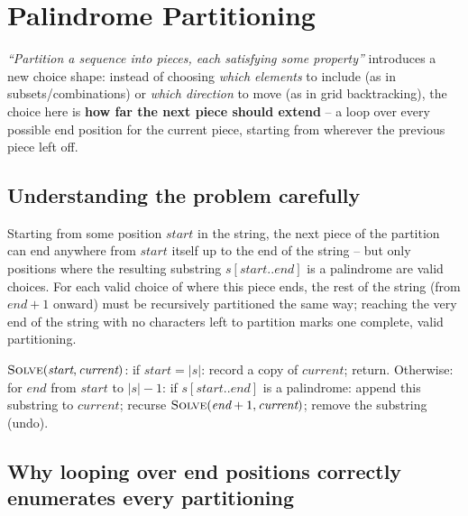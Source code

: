 \section{Palindrome Partitioning}
\label{sec:rec-palindrome-partitioning}


\begin{patternbox}
\emph{``Partition a sequence into pieces, each satisfying some
property''} introduces a new choice shape: instead of choosing
\emph{which elements} to include (as in subsets/combinations) or
\emph{which direction} to move (as in grid backtracking), the choice here
is \textbf{how far the next piece should extend} -- a loop over every
possible end position for the current piece, starting from wherever the
previous piece left off.
\end{patternbox}

\subsection*{Understanding the problem carefully}

Starting from some position $\textit{start}$ in the string, the next
piece of the partition can end anywhere from $\textit{start}$ itself up
to the end of the string -- but only positions where the resulting
substring $s[\textit{start}..\textit{end}]$ is a palindrome are valid
choices. For each valid choice of where this piece ends, the rest of the
string (from $\textit{end}+1$ onward) must be recursively partitioned
the same way; reaching the very end of the string with no characters
left to partition marks one complete, valid partitioning.

\begin{ideabox}
$\textsc{Solve}(\textit{start}, \textit{current})$: if
$\textit{start} = |s|$: record a copy of $\textit{current}$; return.
Otherwise: for $\textit{end}$ from $\textit{start}$ to $|s|-1$: if
$s[\textit{start}..\textit{end}]$ is a palindrome: append this
substring to $\textit{current}$; recurse
$\textsc{Solve}(\textit{end}+1, \textit{current})$; remove the
substring (undo).
\end{ideabox}

\subsection*{Why looping over end positions correctly enumerates every partitioning}

